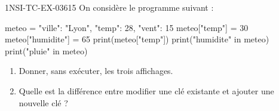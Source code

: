 \begin{exercice}{1NSI-TC-EX-036}{1}{5}
On considère le programme suivant :
\begin{python}
meteo = {"ville": "Lyon", "temp": 28, "vent": 15}
meteo["temp"] = 30
meteo["humidite"] = 65
print(meteo["temp"])
print("humidite" in meteo)
print("pluie" in meteo)
\end{python}
\begin{enumerate}
  \item Donner, sans exécuter, les trois affichages.
  \item Quelle est la différence entre modifier une clé existante et ajouter
        une nouvelle clé ?
\end{enumerate}
\end{exercice}
